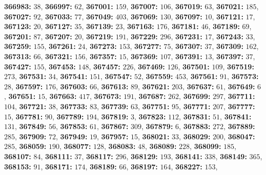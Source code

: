 \textsf{\bfseries 366983:} $38$, \textsf{\bfseries 366997:} $62$, \textsf{\bfseries 367001:} $159$, \textsf{\bfseries 367007:} $106$, \textsf{\bfseries 367019:} $63$, \textsf{\bfseries 367021:} $185$, \textsf{\bfseries 367027:} $92$, \textsf{\bfseries 367033:} $77$, \textsf{\bfseries 367049:} $403$, \textsf{\bfseries 367069:} $130$, \textsf{\bfseries 367097:} $10$, \textsf{\bfseries 367121:} $17$, \textsf{\bfseries 367123:} $20$, \textsf{\bfseries 367127:} $35$, \textsf{\bfseries 367139:} $23$, \textsf{\bfseries 367163:} $176$, \textsf{\bfseries 367181:} $46$, \textsf{\bfseries 367189:} $69$, \textsf{\bfseries 367201:} $87$, \textsf{\bfseries 367207:} $20$, \textsf{\bfseries 367219:} $191$, \textsf{\bfseries 367229:} $296$, \textsf{\bfseries 367231:} $17$, \textsf{\bfseries 367243:} $33$, \textsf{\bfseries 367259:} $155$, \textsf{\bfseries 367261:} $24$, \textsf{\bfseries 367273:} $153$, \textsf{\bfseries 367277:} $75$, \textsf{\bfseries 367307:} $37$, \textsf{\bfseries 367309:} $162$, \textsf{\bfseries 367313:} $66$, \textsf{\bfseries 367321:} $156$, \textsf{\bfseries 367357:} $15$, \textsf{\bfseries 367369:} $107$, \textsf{\bfseries 367391:} $13$, \textsf{\bfseries 367397:} $37$, \textsf{\bfseries 367427:} $155$, \textsf{\bfseries 367453:} $148$, \textsf{\bfseries 367457:} $226$, \textsf{\bfseries 367469:} $126$, \textsf{\bfseries 367501:} $109$, \textsf{\bfseries 367519:} $273$, \textsf{\bfseries 367531:} $34$, \textsf{\bfseries 367541:} $151$, \textsf{\bfseries 367547:} $52$, \textsf{\bfseries 367559:} $453$, \textsf{\bfseries 367561:} $91$, \textsf{\bfseries 367573:} $28$, \textsf{\bfseries 367597:} $176$, \textsf{\bfseries 367603:} $66$, \textsf{\bfseries 367613:} $89$, \textsf{\bfseries 367621:} $203$, \textsf{\bfseries 367637:} $61$, \textsf{\bfseries 367649:} $6$, \textsf{\bfseries 367651:} $15$, \textsf{\bfseries 367663:} $417$, \textsf{\bfseries 367673:} $191$, \textsf{\bfseries 367687:} $262$, \textsf{\bfseries 367699:} $297$, \textsf{\bfseries 367711:} $104$, \textsf{\bfseries 367721:} $38$, \textsf{\bfseries 367733:} $83$, \textsf{\bfseries 367739:} $63$, \textsf{\bfseries 367751:} $95$, \textsf{\bfseries 367771:} $207$, \textsf{\bfseries 367777:} $15$, \textsf{\bfseries 367781:} $90$, \textsf{\bfseries 367789:} $194$, \textsf{\bfseries 367819:} $3$, \textsf{\bfseries 367823:} $112$, \textsf{\bfseries 367831:} $51$, \textsf{\bfseries 367841:} $131$, \textsf{\bfseries 367849:} $56$, \textsf{\bfseries 367853:} $61$, \textsf{\bfseries 367867:} $309$, \textsf{\bfseries 367879:} $6$, \textsf{\bfseries 367883:} $272$, \textsf{\bfseries 367889:} $285$, \textsf{\bfseries 367909:} $72$, \textsf{\bfseries 367949:} $19$, \textsf{\bfseries 367957:} $15$, \textsf{\bfseries 368021:} $33$, \textsf{\bfseries 368029:} $200$, \textsf{\bfseries 368047:} $285$, \textsf{\bfseries 368059:} $190$, \textsf{\bfseries 368077:} $128$, \textsf{\bfseries 368083:} $48$, \textsf{\bfseries 368089:} $228$, \textsf{\bfseries 368099:} $185$, \textsf{\bfseries 368107:} $84$, \textsf{\bfseries 368111:} $37$, \textsf{\bfseries 368117:} $296$, \textsf{\bfseries 368129:} $193$, \textsf{\bfseries 368141:} $338$, \textsf{\bfseries 368149:} $365$, \textsf{\bfseries 368153:} $91$, \textsf{\bfseries 368171:} $174$, \textsf{\bfseries 368189:} $66$, \textsf{\bfseries 368197:} $164$, \textsf{\bfseries 368227:} $153$, 
